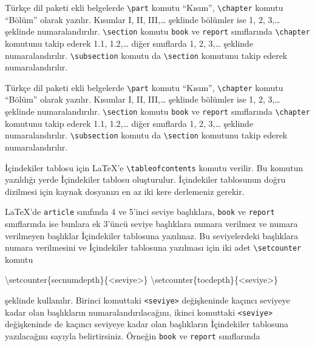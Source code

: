 \documentclass[
  10pt,
]{scrbook}
\newenvironment{Shaded}{\begin{snugshade}}{\end{snugshade}}
\newcommand{\FunctionTok}[1]{\textcolor[rgb]{0.00,0.00,0.00}{#1}}
\newcommand{\NormalTok}[1]{#1}
\theoremstyle{definition}
\theoremstyle{definition}
\theoremstyle{definition}
\theoremstyle{definition}
\theoremstyle{remark}
\begin{document}
Türkçe dil paketi ekli belgelerde \texttt{\textbackslash{}part} komutu ``Kısım'', \texttt{\textbackslash{}chapter} komutu ``Bölüm'' olarak yazılır. Kısımlar I, II, III,\ldots{} şeklinde bölümler ise 1, 2, 3,\ldots{} şeklinde numaralandırılır. \texttt{\textbackslash{}section} komutu \texttt{book} ve \texttt{report} sınıflarında \texttt{\textbackslash{}chapter} komutunu takip ederek 1.1, 1.2,\ldots{} diğer sınıflarda 1, 2, 3,\ldots{} şeklinde numaralandırılır. \texttt{\textbackslash{}subsection} komutu da \texttt{\textbackslash{}section} komutunu takip ederek numaralandırılır.

Türkçe dil paketi ekli belgelerde \texttt{\textbackslash{}part} komutu ``Kısım'', \texttt{\textbackslash{}chapter} komutu ``Bölüm'' olarak yazılır. Kısımlar I, II, III,\ldots{} şeklinde bölümler ise 1, 2, 3,\ldots{} şeklinde numaralandırılır. \texttt{\textbackslash{}section} komutu \texttt{book} ve \texttt{report} sınıflarında \texttt{\textbackslash{}chapter} komutunu takip ederek 1.1, 1.2,\ldots{} diğer sınıflarda 1, 2, 3,\ldots{} şeklinde numaralandırılır. \texttt{\textbackslash{}subsection} komutu da \texttt{\textbackslash{}section} komutunu takip ederek numaralandırılır.

İçindekiler tablosu için LaTeX'e \texttt{\textbackslash{}tableofcontents} komutu verilir. Bu komutun yazıldığı yerde İçindekiler tablosu oluşturulur. İçindekiler tablosunun doğru dizilmesi için kaynak dosyanızı en az iki kere derlemeniz gerekir.

LaTeX'de \texttt{article} sınıfında 4 ve 5'inci seviye başlıklara, \texttt{book} ve \texttt{report} sınıflarında ise bunlara ek 3'üncü seviye başlıklara numara verilmez ve numara verilmeyen başlıklar İçindekiler tablosuna yazılmaz. Bu seviyelerdeki başlıklara numara verilmesini ve İçindekiler tablosuna yazılması için iki adet \texttt{\textbackslash{}setcounter} komutu

\begin{Shaded}
\begin{Highlighting}[]
\FunctionTok{\textbackslash{}setcounter}\NormalTok{\{secnumdepth\}\{\textless{}seviye\textgreater{}\}}
\FunctionTok{\textbackslash{}setcounter}\NormalTok{\{tocdepth\}\{\textless{}seviye\textgreater{}\}}
\end{Highlighting}
\end{Shaded}

şeklinde kullanılır. Birinci komuttaki \texttt{\textless{}seviye\textgreater{}} değişkeninde kaçıncı seviyeye kadar olan başlıkların numaralandırılacağını, ikinci komuttaki \texttt{\textless{}seviye\textgreater{}} değişkeninde de kaçıncı seviyeye kadar olan başlıkların İçindekiler tablosuna yazılacağını sayıyla belirtirsiniz. Örneğin \texttt{book} ve \texttt{report} sınıflarında
\end{document}
